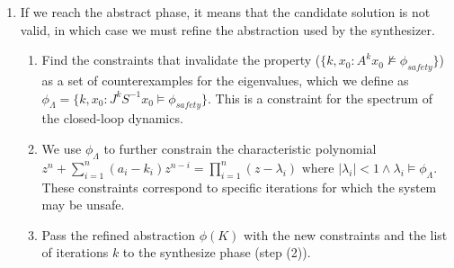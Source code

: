 \documentclass[twocolumn]{autart}    %
\newcommand{\mat}[1]{{#1}}
\renewcommand{\vec}[1]{{#1}}
\begin{document}
\begin{enumerate}
\item If we reach the {\sc abstract} phase, it means that the candidate solution is not valid,
  in which case we must refine the abstraction used by the synthesizer.
\begin{enumerate}
\item Find the constraints that invalidate the property ($\{ k, x_0 : \mat{A}^k\vec{x}_0 \not \models \phi_\mathit{safety}\}$) as a set of counterexamples for the eigenvalues, which we define as $\phi_\Lambda=\{ k, x_0 : \mat{J}^k\mat{S}^{-1}\vec{x}_0 \models \phi_\mathit{safety}\}$. 
This is a constraint for the spectrum of the closed-loop dynamics.  
\item We use $\phi_\Lambda$ to
  further constrain the characteristic polynomial %
$z^n+\sum_{i=1}^n(a_i-k_i)z^{n-i}=\prod_{i=1}^n (z-\lambda_i) \text{ where } |\lambda_i|<1 \wedge \lambda_i \models \phi_{\Lambda}$. These constraints correspond to specific iterations for which the system may be unsafe.
\item Pass the refined abstraction $\phi(K)$ with the new constraints and the list of iterations $k$ to the {\sc synthesize} phase (step (2)).
\end{enumerate} 
\end{enumerate}
\end{document}
